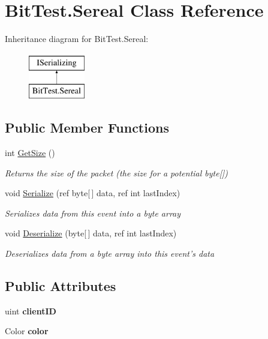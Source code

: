 \hypertarget{class_bit_test_1_1_sereal}{\section{Bit\-Test.\-Sereal Class Reference}
\label{class_bit_test_1_1_sereal}
}
Inheritance diagram for Bit\-Test.\-Sereal\-:\begin{figure}[H]
\begin{center}
\leavevmode
\includegraphics[height=2.000000cm]{class_bit_test_1_1_sereal}
\end{center}
\end{figure}
\subsection*{Public Member Functions}
\begin{DoxyCompactItemize}
\item 
int \hyperlink{class_bit_test_1_1_sereal_aba8f9fa60b53f974ddd59bf83f56fd35}{Get\-Size} ()
\begin{DoxyCompactList}\small\item\em Returns the size of the packet (the size for a potential byte\mbox{[}\mbox{]}) \end{DoxyCompactList}\item 
void \hyperlink{class_bit_test_1_1_sereal_ad5a8343dbe518ffa4c1b99db449638ad}{Serialize} (ref byte\mbox{[}$\,$\mbox{]} data, ref int last\-Index)
\begin{DoxyCompactList}\small\item\em Serializes data from this event into a byte array \end{DoxyCompactList}\item 
void \hyperlink{class_bit_test_1_1_sereal_a09fd14bfb4c58714302d127a3e5030d7}{Deserialize} (byte\mbox{[}$\,$\mbox{]} data, ref int last\-Index)
\begin{DoxyCompactList}\small\item\em Deserializes data from a byte array into this event's data \end{DoxyCompactList}\end{DoxyCompactItemize}
\subsection*{Public Attributes}
\begin{DoxyCompactItemize}
\item 
\hypertarget{class_bit_test_1_1_sereal_a3139b4f271309ee788f73f102d3c1661}{uint {\bfseries client\-I\-D}}\label{class_bit_test_1_1_sereal_a3139b4f271309ee788f73f102d3c1661}

\item 
\hypertarget{class_bit_test_1_1_sereal_a986b0c99c646bb6239c1980c31eba9ca}{Color {\bfseries color}}\label{class_bit_test_1_1_sereal_a986b0c99c646bb6239c1980c31eba9ca}

\end{DoxyCompactItemize}


